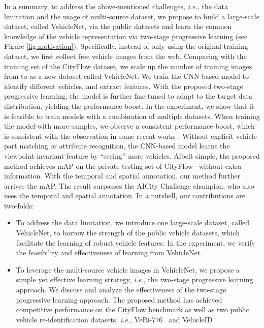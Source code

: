 \documentclass[journal]{IEEEtran}
\def\ie{\emph{i.e.}}
\begin{document}
In a summary, to address the above-mentioned challenges, \ie, the data limitation and the usage of multi-source dataset, we propose to build a large-scale dataset, called VehicleNet, via the public datasets and learn the common knowledge of the vehicle representation via two-stage progressive learning (see Figure \ref{fig:motivation}). 
Specifically, instead of only using the original training dataset, we first collect free vehicle images from the web. Comparing with the training set of the CityFlow dataset, we scale up the number of training images from  to  as a new dataset called VehicleNet. We train the CNN-based model to identify different vehicles, and extract features. With the proposed two-stage progressive learning, the model is further fine-tuned to adapt to the target data distribution, yielding the performance boost. 
In the experiment, we show that it is feasible to train models with a combination of multiple datasets. When training the model with more samples, we observe a consistent performance boost, which is consistent with the observation in some recent works \cite{zheng2019joint,krause2016unreasonable,mahajan2018exploring}. 
Without explicit vehicle part matching or attribute recognition, the CNN-based model learns the viewpoint-invariant feature by ``seeing'' more vehicles.  Albeit simple, the proposed method achieves mAP  on the private testing set of CityFlow~\cite{tang@cityflow} without extra information. With the temporal and spatial annotation, our method further arrives the  mAP. The result surpasses the AICity Challenge  champion, who also uses the temporal and spatial annotation.
In a nutshell, our contributions are two-folds:
\begin{itemize}
    \item To address the data limitation, we introduce one large-scale dataset, called VehicleNet, to borrow the strength of the public vehicle datasets, which facilitate the learning of robust vehicle features. In the experiment, we verify the feasibility and effectiveness of learning from VehicleNet.
    \item To leverage the multi-source vehicle images in VehicleNet, we propose a simple yet  effective learning strategy, \ie, the two-stage progressive learning approach. We discuss and analyze the effectiveness of the two-stage progressive learning approach. The proposed method has achieved competitive performance on the CityFlow benchmark as well as two public vehicle re-identification datasets, \ie, VeRi-776~\cite{liu2016deep} and VehicleID~\cite{liu2016pku}.
\end{itemize}
\end{document}
